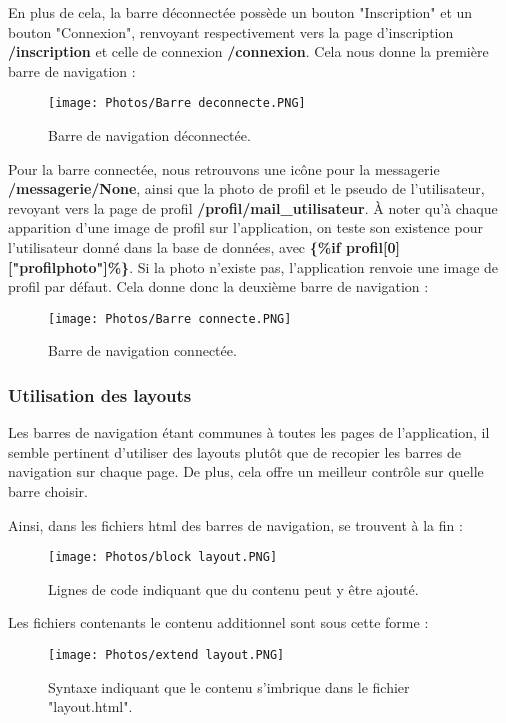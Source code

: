 \documentclass{article}
\begin{document}
En plus de cela, la barre déconnectée possède un bouton "Inscription" et un bouton "Connexion", renvoyant respectivement vers la page d'inscription \textbf{/inscription} et celle de connexion \textbf{/connexion}. Cela nous donne la première barre de navigation :

\begin{figure}[h!]
    \centering
    \texttt{[image: Photos/Barre deconnecte.PNG]}
    \caption{Barre de navigation déconnectée.}
    \label{fig:my_label}
\end{figure}

Pour la barre connectée, nous retrouvons une icône pour la messagerie \textbf{/messagerie/None}, ainsi que la photo de profil et le pseudo de l'utilisateur, revoyant vers la page de profil \textbf{/profil/mail\_utilisateur}. À noter qu'à chaque apparition d'une image de profil sur l'application, on teste son existence pour l'utilisateur donné dans la base de données, avec \textbf{\{\%if profil[0]["profilphoto"]\%\}}. Si la photo n'existe pas, l'application renvoie une image de profil par défaut. Cela donne donc la deuxième barre de navigation :

\begin{figure}[h!]
    \centering
    \texttt{[image: Photos/Barre connecte.PNG]}
    \caption{Barre de navigation connectée.}
    \label{fig:my_label}
\end{figure}

        
\subsubsection{Utilisation des layouts}
Les barres de navigation étant communes à toutes les pages de l'application, il semble pertinent d'utiliser des layouts plutôt que de recopier les barres de navigation sur chaque page. De plus, cela offre un meilleur contrôle sur quelle barre choisir. 

Ainsi, dans les fichiers html des barres de navigation, se trouvent à la fin :

\begin{figure}[h!]
    \centering
    \texttt{[image: Photos/block layout.PNG]}
    \caption{Lignes de code indiquant que du contenu peut y être ajouté.}
    \label{fig:my_label}
\end{figure}
\vspace{5cm}
Les fichiers contenants le contenu additionnel sont sous cette forme :
\begin{figure}[h!]
    \centering
    \texttt{[image: Photos/extend layout.PNG]}
    \caption{Syntaxe indiquant que le contenu s'imbrique dans le fichier "layout.html".}
    \label{fig:my_label}
\end{figure}
\end{document}
